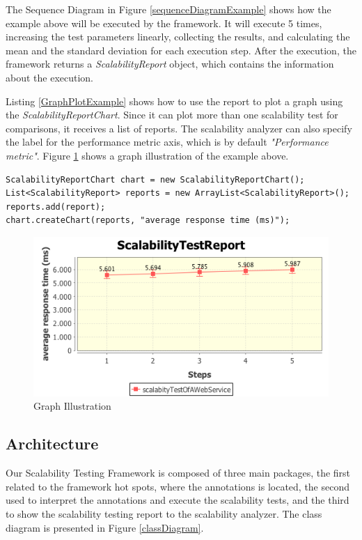 The Sequence Diagram in Figure \ref{sequenceDiagramExample} shows how the example above will be executed by the framework. It will execute 5 times, increasing the test parameters linearly, collecting the results, and calculating the mean and the standard deviation for each execution step. After the execution, the framework returns a \emph{ScalabilityReport} object, which contains the information about the execution.

Listing \ref{GraphPlotExample} shows how to use the report to plot a graph using the \emph{ScalabilityReportChart}. Since it can plot more than one scalability test for comparisons, it receives a list of reports. The scalability analyzer can also specify the label for the performance metric axis, which is by default \emph{"Performance metric"}. Figure \ref{graphIllustration} shows a graph illustration of the example above.

\begin{lstlisting}
ScalabilityReportChart chart = new ScalabilityReportChart();
List<ScalabilityReport> reports = new ArrayList<ScalabilityReport>();
reports.add(report);
chart.createChart(reports, "average response time (ms)");
\end{lstlisting}

\begin{figure}[t]
\begin{center}
	\includegraphics[scale=0.7]{images/graphExample}
\caption{Graph Illustration}
\label{graphIllustration}
\end{center}
\end{figure}

\subsection{Architecture}
Our Scalability Testing Framework is composed of three main packages, the first related to the framework hot spots, where the annotations is located, the second used to interpret the annotations and execute the scalability tests, and the third to show the scalability testing report to the scalability analyzer. The class diagram is presented in Figure \ref{classDiagram}.


